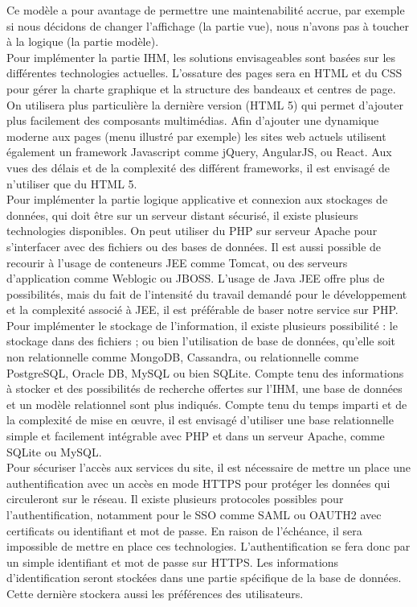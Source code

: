 \documentclass[a4paper,11pt]{article}
\begin{document}
Ce modèle a pour avantage de permettre une maintenabilité accrue, par exemple si nous décidons de
changer l’affichage (la partie vue), nous n’avons pas à toucher à la logique (la partie modèle).\\

Pour implémenter la partie IHM, les solutions envisageables sont basées sur les différentes
technologies actuelles.
L’ossature des pages sera en HTML et du CSS pour gérer la charte graphique et la structure des
bandeaux et centres de page. On utilisera plus particulière la dernière version (HTML 5) qui permet
d’ajouter plus facilement des composants multimédias. Afin d’ajouter une dynamique moderne aux
pages (menu illustré par exemple) les sites web actuels utilisent également un framework Javascript
comme jQuery, AngularJS, ou React. Aux vues des délais et de la complexité des différent frameworks,
il est envisagé de n’utiliser que du HTML 5.\\

Pour implémenter la partie logique applicative et connexion aux stockages de données, qui doit être
sur un serveur distant sécurisé, il existe plusieurs technologies disponibles. On peut utiliser du PHP sur
serveur Apache pour s’interfacer avec des fichiers ou des bases de données. Il est aussi possible de
recourir à l’usage de conteneurs JEE comme Tomcat, ou des serveurs d’application comme Weblogic
ou JBOSS. L’usage de Java JEE offre plus de possibilités, mais du fait de l’intensité du travail demandé
pour le développement et la complexité associé à JEE, il est préférable de baser notre service sur PHP.
Pour implémenter le stockage de l’information, il existe plusieurs possibilité : le stockage dans des
fichiers ; ou bien l’utilisation de base de données, qu’elle soit non relationnelle comme MongoDB,
Cassandra, ou relationnelle comme PostgreSQL, Oracle DB, MySQL ou bien SQLite. Compte tenu des
informations à stocker et des possibilités de recherche offertes sur l’IHM, une base de données et un
modèle relationnel sont plus indiqués. Compte tenu du temps imparti et de la complexité de mise en
œuvre, il est envisagé d’utiliser une base relationnelle simple et facilement intégrable avec PHP et
dans un serveur Apache, comme SQLite ou MySQL.\\

Pour sécuriser l’accès aux services du site, il est nécessaire de mettre un place une authentification
avec un accès en mode HTTPS pour protéger les données qui circuleront sur le réseau. Il existe
plusieurs protocoles possibles pour l’authentification, notamment pour le SSO comme SAML ou
OAUTH2 avec certificats ou identifiant et mot de passe. En raison de l’échéance, il sera impossible de
mettre en place ces technologies. L’authentification se fera donc par un simple identifiant et mot de
passe sur HTTPS. Les informations d’identification seront stockées dans une partie spécifique de la
base de données. Cette dernière stockera aussi les préférences des utilisateurs.\\
\end{document}
